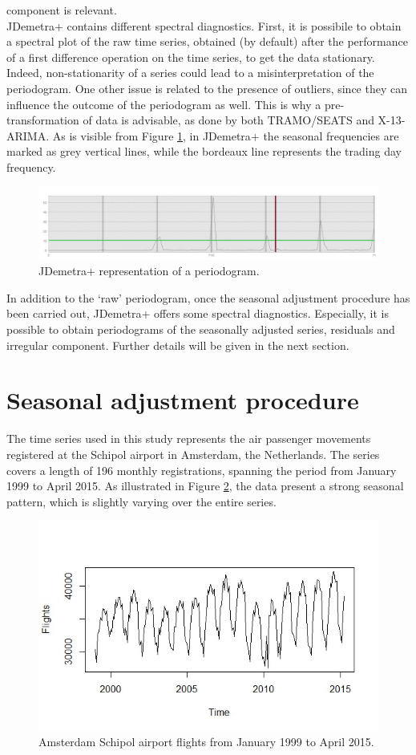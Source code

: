 \documentclass[english,blauw]{cbsdiscussionpaper}
\begin{document}
component is relevant.\\JDemetra+ contains different spectral diagnostics. First, it is possibile to obtain a spectral plot of the raw time series, obtained (by default) after the performance of a first difference operation on the time series, to get the data stationary. Indeed, non-stationarity of a series could lead to a misinterpretation of the periodogram.  One other issue is related to the presence of outliers, since they can influence the outcome of the periodogram as well. This is why a pre-transformation of data is advisable, as done by both TRAMO/SEATS and X-13-ARIMA.  As is visible from Figure \ref{fig:raw}, in JDemetra+ the seasonal frequencies are marked as grey vertical lines, while the bordeaux line represents the trading day frequency.
\begin{figure}[h]
\includegraphics[width=\linewidth]{../images/capitolo2/raw.jpg}
\caption{JDemetra+ representation of a periodogram.}
\label{fig:raw}
\end{figure}
In addition to the ‘raw’ periodogram, once the seasonal adjustment procedure has been carried out, JDemetra+ offers some spectral diagnostics. Especially, it is possible to obtain periodograms of the seasonally adjusted series, residuals and irregular component. Further details will be given in the next section.
\section{Seasonal adjustment procedure}
The time series used in this study represents the air passenger movements registered at the Schipol airport in Amsterdam, the Netherlands. The series covers a length of 196 monthly registrations, spanning the period from January 1999 to April 2015. As illustrated in Figure \ref{fig:series}, the data present a strong seasonal pattern, which is slightly varying over the entire series.
\begin{figure}[h]
 \includegraphics[width=\linewidth]{../images/capitolo3/series.jpg}
 \caption{Amsterdam Schipol airport flights from January 1999 to April 2015.}
 \label{fig:series}
\end{figure}
\end{document}
